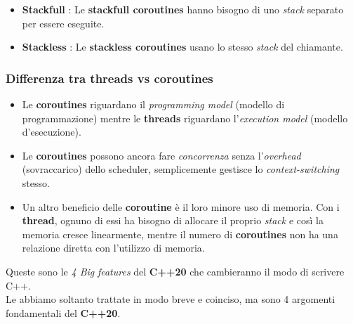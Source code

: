 \begin{itemize}
	\item \textsf{\small \textbf{Stackfull} : Le \textbf{stackfull coroutines} hanno bisogno di uno \emph{stack} separato per essere eseguite.}
	\item \textsf{\small \textbf{Stackless} : Le \textbf{stackless coroutines} usano lo stesso \emph{stack} del chiamante.}
\end{itemize}

\subsubsection{Differenza tra threads vs coroutines}

\begin{itemize}
	\item \textsf{\small Le \textbf{coroutines} riguardano il \emph{programming model} (modello di programmazione) mentre le \textbf{threads} riguardano l'\emph{execution model} (modello d'esecuzione).} \\
	\item \textsf{\small Le \textbf{coroutines} possono ancora fare \emph{concorrenza} senza l'\emph{overhead} (sovraccarico) dello scheduler, semplicemente gestisce lo \emph{context-switching} stesso.} \\
	\item \textsf{\small Un altro beneficio delle \textbf{coroutine} è il loro minore uso di memoria. Con i \textbf{thread}, ognuno di essi ha bisogno di allocare il proprio \emph{stack} e così la memoria cresce linearmente, mentre il numero di \textbf{coroutines} non ha una relazione diretta con l'utilizzo di memoria. } \\
\end{itemize}

\break

\textsf{\small Queste sono le \emph{4 Big} \emph{features} del \textbf{C++20} che cambieranno il modo di scrivere C++.} \\

\textsf{\small Le abbiamo soltanto trattate in modo breve e coinciso, ma sono 4 argomenti fondamentali del \textbf{C++20}.} \\

